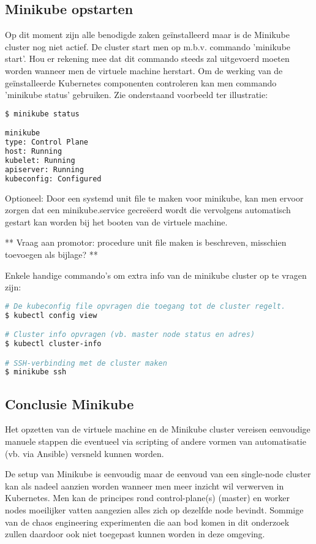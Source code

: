 \subsection{Minikube opstarten}

Op dit moment zijn alle benodigde zaken geïnstalleerd maar is de Minikube cluster nog niet actief. De cluster start men op m.b.v. commando 'minikube start'. Hou er rekening mee dat dit commando steeds zal uitgevoerd moeten worden wanneer men de virtuele machine herstart.
Om de werking van de geïnstalleerde Kubernetes componenten controleren kan men commando 'minikube status' gebruiken. Zie onderstaand voorbeeld ter illustratie: 
\begin{lstlisting}[language=bash]
$ minikube status

minikube
type: Control Plane
host: Running
kubelet: Running
apiserver: Running
kubeconfig: Configured
\end{lstlisting} 

Optioneel: Door een systemd unit file te maken voor minikube, kan men ervoor zorgen dat een minikube.service gecreëerd wordt die vervolgens automatisch gestart kan worden bij het booten van de virtuele machine. 

** Vraag aan promotor: procedure unit file maken is beschreven, misschien toevoegen als bijlage? **

Enkele handige commando's om extra info van de minikube cluster op te vragen zijn:
\begin{lstlisting}[language=bash]
# De kubeconfig file opvragen die toegang tot de cluster regelt.
$ kubectl config view 

# Cluster info opvragen (vb. master node status en adres)
$ kubectl cluster-info

# SSH-verbinding met de cluster maken
$ minikube ssh 
\end{lstlisting}

\subsection{Conclusie Minikube}

Het opzetten van de virtuele machine en de Minikube cluster vereisen eenvoudige manuele stappen die eventueel via scripting of andere vormen van automatisatie (vb. via Ansible) versneld kunnen worden.

De setup van Minikube is eenvoudig maar de eenvoud van een single-node cluster kan als nadeel aanzien worden wanneer men meer inzicht wil verwerven in Kubernetes. Men kan de principes rond control-plane(s) (master) en worker nodes moeilijker vatten aangezien alles zich op dezelfde node bevindt. Sommige van de chaos engineering experimenten die aan bod komen in dit onderzoek zullen daardoor ook niet toegepast kunnen worden in deze omgeving.

